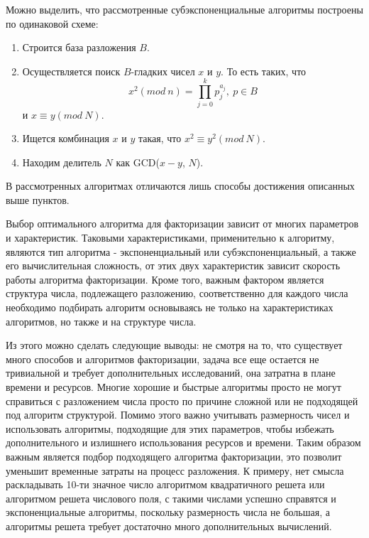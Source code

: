   Можно выделить, что рассмотренные субэкспоненциальные алгоритмы построены по одинаковой схеме:
    \begin{enumerate}
      \item Строится база разложения $B$.
      \item Осуществляется поиск $B$-гладких чисел $x$ и $y$. То есть таких, что
        \begin{equation}
          x^2 (mod \:n)=\prod_{j=0}^{k}{p^{a_j}_j}, \: p \in B
        \end{equation}
      и $x \equiv y (mod \: N)$.
      \item Ищется комбинация $x$ и $y$ такая, что $x^2 \equiv y^2 (mod \: N)$.
      \item Находим делитель $N$ как GCD($x-y$, $N$).
    \end{enumerate}

  В рассмотренных алгоритмах отличаются лишь способы достижения описанных выше пунктов.
  
  Выбор оптимального алгоритма для факторизации зависит от многих параметров и характеристик. Таковыми характеристиками, применительно к алгоритму, 
  являются тип алгоритма - экспоненциальный или субэкспоненциальный, а также его вычислительная сложность, от этих двух характеристик зависит скорость работы алгоритма факторизации. Кроме того, важным фактором является структура числа, подлежащего разложению, соответственно для каждого числа необходимо подбирать алгоритм основываясь не только на характеристиках алгоритмов, но также и на структуре числа. 

  Из этого можно сделать следующие выводы: не смотря на то, что существует много способов и алгоритмов факторизации, задача все еще остается не тривиальной и требует дополнительных исследований, она затратна в плане времени и ресурсов. Многие хорошие и быстрые алгоритмы просто не могут справиться с разложением числа просто по причине сложной или не подходящей под алгоритм структурой. Помимо этого важно учитывать размерность чисел и использовать алгоритмы, подходящие для этих параметров, чтобы избежать дополнительного и излишнего использования ресурсов и времени. Таким образом важным является подбор подходящего алгоритма факторизации, это позволит уменьшит временные затраты на процесс разложения. К примеру, нет смысла раскладывать 10-ти значное число алгоритмом квадратичного решета или алгоритмом решета числового поля, с такими числами успешно справятся и экспоненциальные алгоритмы, поскольку размерность числа не большая, а алгоритмы решета требует достаточно много дополнительных вычислений.

